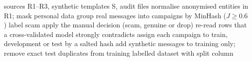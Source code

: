 \begin{algorithm}[H]
\caption{Building and splitting ScamGuard-IN-2026}
\label{alg:build}
\begin{algorithmic}[1]
\Require sources R1--R3, synthetic templates S, audit files
\State normalise anonymised entities in R1; mask personal data
\State group real messages into campaigns by MinHash ($J\ge0.6$)
   \State label scam \Else \State apply the manual decision (scam, genuine or drop) \EndIf
\EndFor
\State re-read rows that a cross-validated model strongly contradicts
\State assign each campaign to train, development or test by a salted hash
\State add synthetic messages to training only; remove exact test duplicates from training
\State \Return labelled dataset with split column
\end{algorithmic}
\end{algorithm}